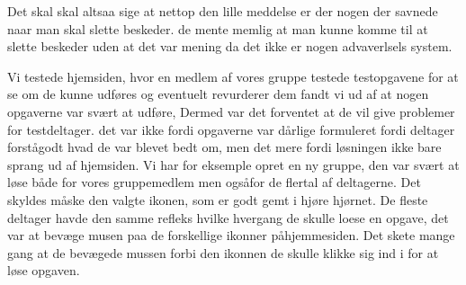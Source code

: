 Det skal skal altsaa sige at nettop den lille meddelse er der nogen der savnede naar man skal slette beskeder. de
mente memlig at man kunne komme til at slette beskeder uden at det var mening da det ikke er nogen advaverlsels system. 

Vi testede hjemsiden, hvor en medlem af vores gruppe testede testopgavene for at se om de kunne udf\o res og eventuelt revurderer dem fandt vi
ud af at nogen opgaverne var sv\ae rt at udf\o re, Dermed var det forventet at de vil give problemer for testdeltager. det var ikke fordi 
opgaverne var d\aa rlige formuleret fordi deltager forst\aa godt hvad de var blevet bedt om, men det mere fordi l\o sningen ikke bare 
sprang ud af hjemsiden.
Vi har for eksemple opret en ny gruppe, den var sv\ae rt at l\o se b\aa de for vores gruppemedlem men ogs\aa  for de flertal af deltagerne.
Det skyldes m\aa ske den valgte ikonen, som er godt gemt i hj\o re hj\o rnet. De fleste deltager havde den samme refleks hvilke hvergang de 
skulle loese en opgave, det var at bev\ae ge musen paa de forskellige ikonner p\aa hjemmesiden. Det skete mange gang at de bev\ae gede mussen 
forbi den ikonnen de skulle klikke sig ind i for at l\o se opgaven.      